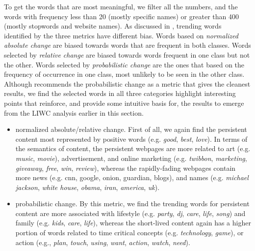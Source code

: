 \documentclass[phd,tocprelim]{cornell}
\begin{document}
To get the words that are most meaningful, we filter all the numbers, and the words with frequency less than 20 (mostly specific names) or greater than 400 (mostly stopwords and website names). As discussed in \cite{Kleinberg:2004}, trending words identified by the three metrics have different bias. Words based on \emph{normalized absolute change} are biased towards words that are frequent in both classes. Words selected by \emph{relative change} are biased towards words frequent in one class but not the other. Words selected by \emph{probabilistic change} are the ones that based on the frequency of occurrence in one class, most unlikely to be seen in the other class. Although \cite{Kleinberg:2004} recommends the probabilistic change as a metric that gives the cleanest results, 
we find the selected words in all three categories highlight
interesting points that reinforce, and provide some intuitive basis for,
the results to emerge from the LIWC analysis earlier in this section.
\begin{itemize}
\item normalized absolute/relative change. First of all, we again find the persistent content most represented by positive words (e.g. \emph{good}, \emph{best}, \emph{love}). In terms of the semantics of content, the persistent webpages are more related to art (e.g. \emph{music}, \emph{movie}), advertisement, and online marketing (e.g. \emph{twibbon}, \emph{marketing}, \emph{giveaway}, \emph{free}, \emph{win}, \emph{review}), whereas the rapidly-fading webpages contain more news (e.g. cnn, google, onion, guardian, blogs), and names (e.g. \emph{michael jackson}, \emph{white house}, \emph{obama}, \emph{iran}, \emph{america}, \emph{uk}).
\item probabilistic change. By this metric, we find the trending words for persistent content are more associated with lifestyle (e.g. \emph{party}, \emph{dj}, \emph{care}, \emph{life}, \emph{song}) and family (e.g. \emph{kids}, \emph{care}, \emph{life}), whereas the short-lived content again has a higher portion of words related to time critical concepts (e.g. \emph{technology}, \emph{game}), or action (e.g., \emph{plan}, \emph{touch}, \emph{using}, \emph{want}, \emph{action}, \emph{watch}, \emph{need}).
\end{itemize}
\end{document}
